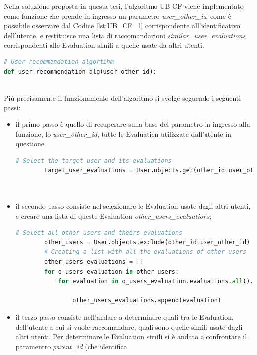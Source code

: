 Nella soluzione proposta in questa tesi, l'algoritmo UB-CF viene implementato come funzione che prende in ingresso un parametro 
\textit{user\_other\_id}, come è possibile osservare dal Codice \ref{lst:UB_CF_1} corrispondente all'identificativo dell'utente, 
e restituisce una lista di raccomandazioni \textit{similar\_user\_evaluations} corrispondenti alle Evaluation simili a quelle usate 
da altri utenti. 
\lstset{style=python_code_style}
\begin{lstlisting}[language=Python, label=lst:UB_CF_1, caption={\ }]
# User recommendation algortihm
def user_recommendation_alg(user_other_id):
\end{lstlisting}
\ \\
Più precisamente il funzionamento dell'algoritmo si svolge seguendo i seguenti passi:
\begin{itemize}
	\item il primo passo è quello di recuperare sulla base del parametro in ingresso alla funzione, lo \textit{user\_other\_id},
	tutte le Evaluation utilizzate dall'utente in questione
	\begin{lstlisting}[language=Python, label=lst:UB_CF_2]
		# Select the target user and its evaluations
		target_user_evaluations = User.objects.get(other_id=user_other_id).evaluations.all()\
																					.values('other_id', 'id', 'parent_id')\
																					.order_by('other_id')
	\end{lstlisting}
	\item il secondo passo consiste nel selezionare le Evaluation usate dagli altri utenti, e creare una lista di queste Evaluation
	\textit{other\_users\_evaluations};
	\begin{lstlisting}[language=Python, label=lst:UB_CF_3]
		# Select all other users and theirs evaluations
		other_users = User.objects.exclude(other_id=user_other_id)
		# Creating a list with all the evaluations of other users
		other_users_evaluations = []
		for o_users_evaluation in other_users:
			for evaluation in o_users_evaluation.evaluations.all().values('other_id', 'id', 'parent_id')\
																	.order_by('other_id'):
				other_users_evaluations.append(evaluation)
	\end{lstlisting}
	\item il terzo passo consiste nell'andare a determinare quali tra le Evaluation, dell'utente a cui si vuole raccomandare, quali sono quelle 
	simili usate dagli altri utenti. Per determinare le Evaluation simili si è andato a confrontare il paramentro \textit{parent\_id} (che identifica

\end{itemize}
